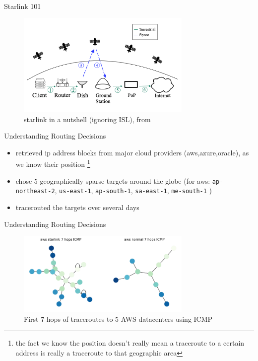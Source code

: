 \documentclass[NET,english,beameralt]{tumbeamer}
\begin{document}
\begin{frame}{Starlink 101}
\begin{figure}
    \includegraphics[width=0.75\textwidth]{pics/starlink-101.png}
    \caption[short]{starlink in a nutshell (ignoring ISL), from \cite{izhikevich2023democratizing}}
\end{figure}
\end{frame}

\begin{frame}{Understanding Routing Decisions}
\begin{itemize}
    \item retrieved ip address blocks from major cloud providers (aws,azure,oracle), as we know their position
    \footnote[]{the fact we know the position doesn't really mean a traceroute to a certain address is really a
    traceroute to that geographic area}
    \item chose 5 geographically sparse targets around the globe (for aws: \texttt{ap-northeast-2}, \texttt{us-east-1}, \texttt{ap-south-1},
    \texttt{sa-east-1}, \texttt{me-south-1} )
    \item tracerouted the targets over several days 
\end{itemize}
\end{frame}

\begin{frame}{Understanding Routing Decisions}
\begin{figure}
    \includegraphics[width=0.75\textwidth]{pics/aws_7_icmp.png}
    \caption[short]{First 7 hops of traceroutes to 5 AWS datacenters using ICMP}
\end{figure}
\end{frame}
\end{document}
